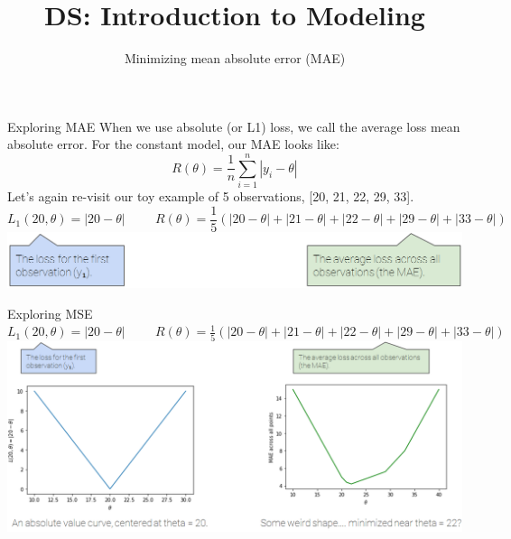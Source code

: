\documentclass[aspectratio=169]{../latex_main/tntbeamer}  %
\title[Introduction]{DS: Introduction to Modeling}
\subtitle{Minimizing mean absolute error (MAE)}
\begin{document}
	
	\maketitle
	\begin{frame}{Exploring MAE}
	    When we use absolute (or L1) loss, we call the average loss mean absolute error. For the constant model, our MAE looks like:
	    \begin{equation*}
	        R(\theta) = \frac{1}{n}\sum\limits_{i=1}^n|y_i - \theta|
	    \end{equation*}
	    Let’s again re-visit our toy example of 5 observations,  [20, 21, 22, 29, 33].
	    \begin{equation*}
	        L_1(20,\theta) = |20 - \theta| \hspace{1cm} R(\theta) = \frac{1}{5}(|20 - \theta| + |21-\theta| + |22 - \theta| + |29 - \theta| + |33 - \theta|)
	    \end{equation*}
	    \hspace{1cm}\includegraphics[scale=.4]{Bild35}
	\end{frame}
	
	
	
	\begin{frame}{Exploring MSE}
	        $L_1(20,\theta) = |20 - \theta| \hspace{1cm} R(\theta) = \frac{1}{5}(|20 - \theta| + |21-\theta| + |22 - \theta| + |29 - \theta| + |33 - \theta|)$
	    \includegraphics[scale=.4]{Bild36}
	\end{frame}
	
\end{document}
